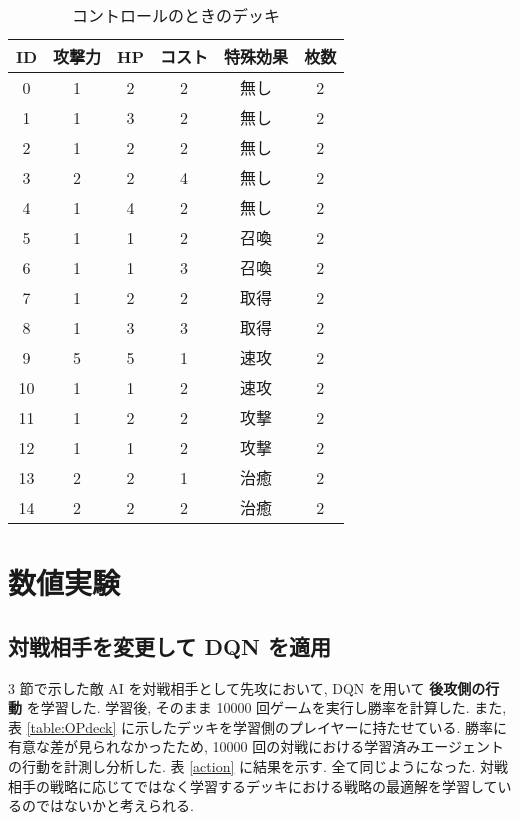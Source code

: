 \documentclass{jarticle}     %
\begin{document}
    \begin{table}[h]
      \centering
      \caption{コントロールのときのデッキ}
      \label{table:controlldeck}
      \begin{tabular}{|c|c|c|c|c|c|}
      \hline
      ID & 攻撃力 & HP & コスト & 特殊効果 & 枚数 \\ \hline
      0 & 1 & 2 & 2 & 無し & 2 \\ \hline
      1 & 1 & 3 & 2 & 無し & 2 \\ \hline
      2 & 1 & 2 & 2 & 無し & 2 \\ \hline
      3 & 2 & 2 & 4 & 無し & 2 \\ \hline
      4 & 1 & 4 & 2 & 無し & 2 \\ \hline
      5 & 1 & 1 & 2 & 召喚 & 2 \\ \hline
      6 & 1 & 1 & 3 & 召喚 & 2 \\ \hline
      7 & 1 & 2 & 2 & 取得 & 2 \\ \hline
      8 & 1 & 3 & 3 & 取得 & 2 \\ \hline
      9 & 5 & 5 & 1 & 速攻 & 2 \\ \hline
      10 & 1 & 1 & 2 & 速攻 & 2 \\ \hline
      11 & 1 & 2 & 2 & 攻撃 & 2 \\ \hline
      12 & 1 & 1 & 2 & 攻撃 & 2 \\ \hline
      13 & 2& 2 & 1 & 治癒 & 2 \\ \hline
      14 & 2 & 2 & 2 & 治癒 & 2 \\ \hline
      \end{tabular}
      \end{table}


\section{数値実験}

\subsection{対戦相手を変更して DQN を適用 }
3 節で示した敵 AI を対戦相手として先攻において, DQN を用いて \textbf{後攻側の行動} を学習した. 学習後, そのまま 10000 回ゲームを実行し勝率を計算した. また, 表 \ref{table:OPdeck} に示したデッキを学習側のプレイヤーに持たせている.
勝率に有意な差が見られなかったため, 10000 回の対戦における学習済みエージェントの行動を計測し分析した. 表 \ref{action} に結果を示す. 全て同じようになった. 対戦相手の戦略に応じてではなく学習するデッキにおける戦略の最適解を学習しているのではないかと考えられる.
\end{document}
